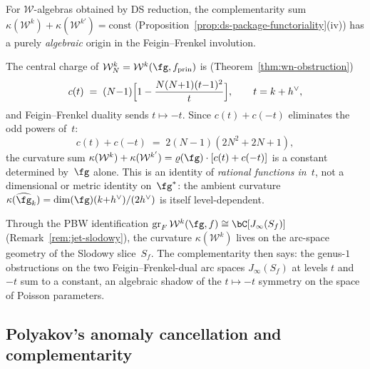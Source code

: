 \begin{remark}
\label{rem:complementarity-slodowy}
For $\mathcal{W}$-algebras obtained by DS reduction, the
complementarity sum
$\kappa(\mathcal{W}^k) + \kappa(\mathcal{W}^{k'})
= \mathrm{const}$
(Proposition~\ref{prop:ds-package-functoriality}(iv))
has a purely \emph{algebraic} origin in the Feigin--Frenkel
involution.

The central charge of $\mathcal{W}_N^k = \mathcal{W}^k(\fg,
f_{\mathrm{prin}})$ is
(Theorem~\ref{thm:wn-obstruction})
\begin{equation}\label{eq:wn-central-charge-complement}
c(t) \;=\; (N{-}1)\Bigl[1 -
\frac{N(N{+}1)(t{-}1)^2}{t}\Bigr],
\qquad t = k + h^\vee,
\end{equation}
and Feigin--Frenkel duality sends $t \mapsto -t$. Since
$c(t) + c(-t)$ eliminates the odd powers of~$t$:
\[
c(t) + c(-t) \;=\; 2(N{-}1)(2N^2{+}2N{+}1),
\]
the curvature sum
$\kappa(\mathcal{W}^k) + \kappa(\mathcal{W}^{k'})
= \varrho(\fg) \cdot [c(t) + c(-t)]$ is a
constant determined by~$\fg$ alone.
This is an identity of \emph{rational functions in~$t$},
not a dimensional or metric identity on~$\fg^*$:
the ambient curvature $\kappa(\widehat{\fg}_k)
= \dim(\fg)(k{+}h^\vee)/(2h^\vee)$ is itself
level-dependent.

Through the PBW identification
$\operatorname{gr}_F \mathcal{W}^k(\fg,f) \cong
\bC[J_\infty(S_f)]$
(Remark~\ref{rem:jet-slodowy}), the curvature
$\kappa(\mathcal{W}^k)$ lives on the arc-space geometry of
the Slodowy slice~$S_f$. The complementarity then says:
the genus-$1$ obstructions on the two Feigin--Frenkel-dual
arc spaces $J_\infty(S_f)$ at levels $t$ and $-t$ sum to
a constant, an algebraic shadow of the $t \mapsto -t$
symmetry on the space of Poisson parameters.
\end{remark}

\subsection{Polyakov's anomaly cancellation and complementarity}
\label{subsec:polyakov-complementarity}

